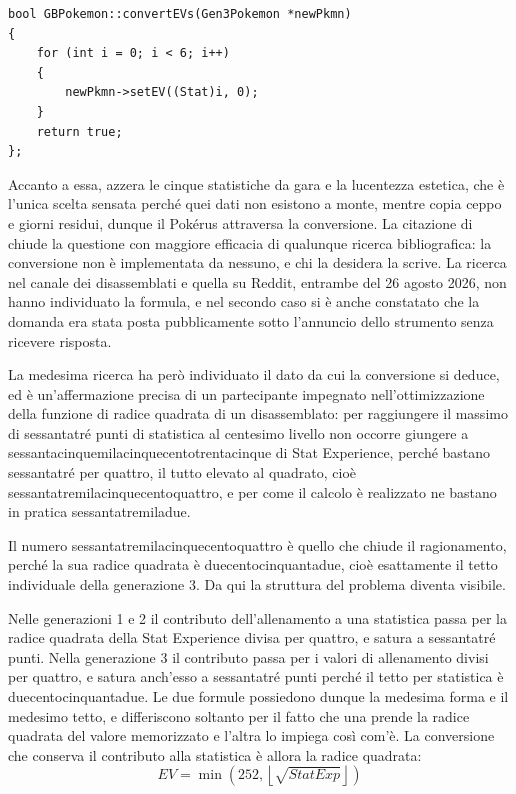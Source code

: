 \begin{verbatim}
bool GBPokemon::convertEVs(Gen3Pokemon *newPkmn)
{
    for (int i = 0; i < 6; i++)
    {
        newPkmn->setEV((Stat)i, 0);
    }
    return true;
};
\end{verbatim}

Accanto a essa,  azzera le cinque statistiche da gara e la lucentezza estetica, che è l'unica scelta sensata perché quei dati non esistono a monte, mentre  copia ceppo e giorni residui, dunque il Pokérus attraversa la conversione. La citazione di  chiude la questione con maggiore efficacia di qualunque ricerca bibliografica: la conversione non è implementata da nessuno, e chi la desidera la scrive. La ricerca nel canale dei disassemblati e quella su Reddit, entrambe del 26 agosto 2026, non hanno individuato la formula, e nel secondo caso si è anche constatato che la domanda era stata posta pubblicamente sotto l'annuncio dello strumento senza ricevere risposta.

La medesima ricerca ha però individuato il dato da cui la conversione si deduce, ed è un'affermazione precisa di un partecipante impegnato nell'ottimizzazione della funzione di radice quadrata di un disassemblato: per raggiungere il massimo di sessantatré punti di statistica al centesimo livello non occorre giungere a sessantacinquemilacinquecentotrentacinque di Stat Experience, perché bastano sessantatré per quattro, il tutto elevato al quadrato, cioè sessantatremilacinquecentoquattro, e per come il calcolo è realizzato ne bastano in pratica sessantatremiladue.

Il numero sessantatremilacinquecentoquattro è quello che chiude il ragionamento, perché la sua radice quadrata è duecentocinquantadue, cioè esattamente il tetto individuale della generazione 3. Da qui la struttura del problema diventa visibile.

Nelle generazioni 1 e 2 il contributo dell'allenamento a una statistica passa per la radice quadrata della Stat Experience divisa per quattro, e satura a sessantatré punti. Nella generazione 3 il contributo passa per i valori di allenamento divisi per quattro, e satura anch'esso a sessantatré punti perché il tetto per statistica è duecentocinquantadue. Le due formule possiedono dunque la medesima forma e il medesimo tetto, e differiscono soltanto per il fatto che una prende la radice quadrata del valore memorizzato e l'altra lo impiega così com'è. La conversione che conserva il contributo alla statistica è allora la radice quadrata:
\[
EV = \min\left(252, \left\lfloor \sqrt{StatExp} \right\rfloor \right)
\]

